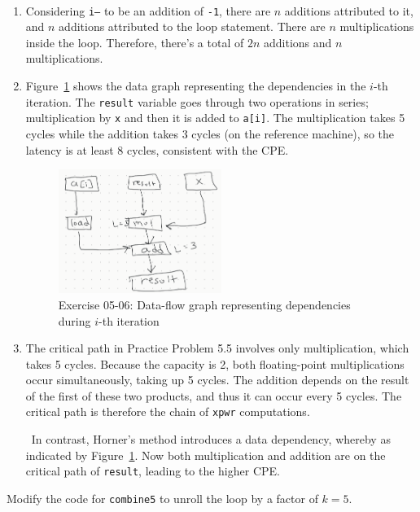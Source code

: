 \documentclass[12pt]{article}
\newenvironment{ex}[2][Exercise]{\begin{trivlist}
		\item[\hskip \labelsep {\bfseries #1}\hskip \labelsep {\bfseries #2.}]}{\end{trivlist}}
\newenvironment{sol}[1][Solution]{\begin{trivlist}
		\item[\hskip \labelsep {\bfseries #1:}]}{\end{trivlist}}
\begin{document}
\begin{sol}
	\
	\begin{enumerate}[label=(\alph*)]
		\item Considering \texttt{i--} to be an addition of \texttt{-1}, there are
		$n$ additions attributed to it, and $n$ additions attributed to the loop
		statement. There are $n$ multiplications inside the loop. Therefore, there's
		a total of $2n$ additions and $n$ multiplications.
		\item Figure~\ref{fig:ex-05.06} shows the data graph representing the dependencies
		in the $i$-th iteration. The \texttt{result} variable goes through two operations
		in series; multiplication by \texttt{x} and then it is added to \texttt{a[i]}.
		The multiplication takes 5 cycles while the addition takes 3 cycles (on the
		reference machine), so the latency is at least 8 cycles, consistent with the
		CPE.
		\begin{figure}
			\centering
			\includegraphics[width=0.5\textwidth]{exercise-05-06.png}
			\caption{Exercise 05-06: Data-flow graph representing dependencies during
				$i$-th iteration}
			\label{fig:ex-05.06}
		\end{figure}
		\item The critical path in Practice Problem 5.5 involves only multiplication, which takes
		5 cycles. Because the capacity is 2, both floating-point multiplications occur
		simultaneously, taking up 5 cycles. The addition depends on the result of the
		first of these two products, and thus it can occur every 5 cycles. The critical
		path is therefore the chain of \texttt{xpwr} computations.
		
		\
		In contrast, Horner's method introduces a data dependency, whereby as indicated
		by Figure~\ref{fig:ex-05.06}. Now both multiplication and addition are on the
		critical path of \texttt{result}, leading to the higher CPE.
	\end{enumerate}
\end{sol}

\begin{ex}{5.7}
	Modify the code for \texttt{combine5} to unroll the loop by a factor of $k=5$.
\end{ex}
\end{document}
